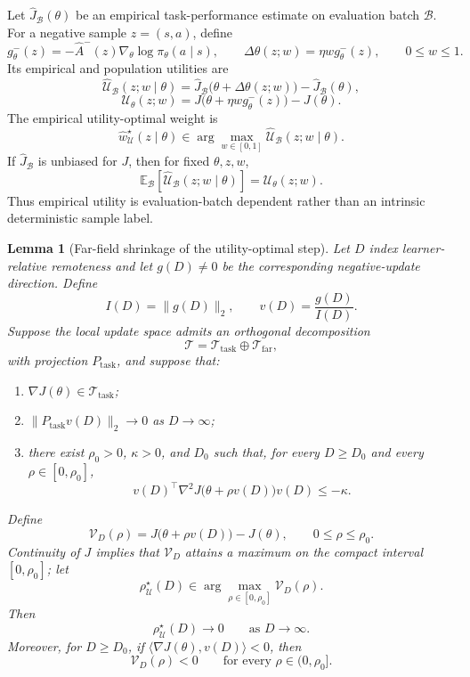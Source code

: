 \documentclass{article}
\theoremstyle{plain}
\newtheorem{lemma}[theorem]{Lemma}
\theoremstyle{definition}
\theoremstyle{remark}
\begin{document}
Let \(\widehat J_{\mathcal B}(\theta)\) be an empirical task-performance
estimate on evaluation batch \(\mathcal B\). For a negative sample
\(z=(s,a)\), define
\[
g_\theta^-(z)
=
-\widehat A^-(z)\nabla_\theta\log\pi_\theta(a\mid s),
\qquad
\Delta\theta(z;w)
=
\eta w g_\theta^-(z),
\qquad
0\le w\le1.
\]
Its empirical and population utilities are
\[
\widehat{\mathcal U}_{\mathcal B}(z;w\mid\theta)
=
\widehat J_{\mathcal B}\bigl(\theta+\Delta\theta(z;w)\bigr)
-
\widehat J_{\mathcal B}(\theta),
\]
\[
\mathcal U_\theta(z;w)
=
J\bigl(\theta+\eta w g_\theta^-(z)\bigr)-J(\theta).
\]
The empirical utility-optimal weight is
\[
\widehat w_{\mathcal U}^\star(z\mid\theta)
\in
\arg\max_{w\in[0,1]}
\widehat{\mathcal U}_{\mathcal B}(z;w\mid\theta).
\]
If \(\widehat J_{\mathcal B}\) is unbiased for \(J\), then for fixed
\(\theta,z,w\),
\[
\mathbb E_{\mathcal B}
\left[
\widehat{\mathcal U}_{\mathcal B}(z;w\mid\theta)
\right]
=
\mathcal U_\theta(z;w).
\]
Thus empirical utility is evaluation-batch dependent rather than an
intrinsic deterministic sample label.

\begin{lemma}[Far-field shrinkage of the utility-optimal step]
\label{lem:far_field_utility}
Let \(D\) index learner-relative remoteness and let \(g(D)\ne0\) be the
corresponding negative-update direction. Define
\[
I(D)=\|g(D)\|_2,
\qquad
v(D)=\frac{g(D)}{I(D)}.
\]
Suppose the local update space admits an
orthogonal decomposition
\[
\mathcal T
=
\mathcal T_{\mathrm{task}}
\oplus
\mathcal T_{\mathrm{far}},
\]
with projection \(P_{\mathrm{task}}\), and suppose that:
\begin{enumerate}
    \item \(\nabla J(\theta)\in\mathcal T_{\mathrm{task}}\);

    \item \(\|P_{\mathrm{task}}v(D)\|_2\to0\) as \(D\to\infty\);

    \item there exist \(\rho_0>0\), \(\kappa>0\), and \(D_0\) such that,
    for every \(D\ge D_0\) and every \(\rho\in[0,\rho_0]\),
    \[
    v(D)^\top
    \nabla^2J\bigl(\theta+\rho v(D)\bigr)
    v(D)
    \le
    -\kappa.
    \]
\end{enumerate}
Define
\[
\mathcal V_D(\rho)
=
J\bigl(\theta+\rho v(D)\bigr)-J(\theta),
\qquad
0\le\rho\le\rho_0.
\]
Continuity of \(J\) implies that \(\mathcal V_D\) attains a maximum
on the compact interval \([0,\rho_0]\); let
\[
\rho_{\mathcal U}^\star(D)
\in
\arg\max_{\rho\in[0,\rho_0]}
\mathcal V_D(\rho).
\]
Then
\[
\rho_{\mathcal U}^\star(D)\to0
\qquad
\text{as }D\to\infty.
\]
Moreover, for \(D\ge D_0\), if
\(\langle\nabla J(\theta),v(D)\rangle<0\), then
\[
\mathcal V_D(\rho)<0
\qquad
\text{for every }\rho\in(0,\rho_0].
\]
\end{lemma}
\end{document}
